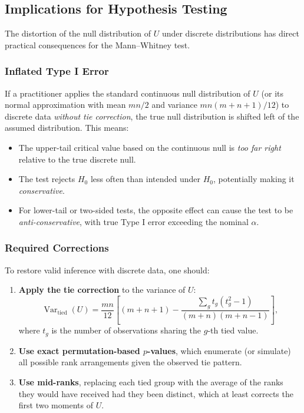 \documentclass[10pt]{article}
\begin{document}
\subsection{Implications for Hypothesis Testing}

The distortion of the null distribution of $U$ under discrete
distributions has direct practical consequences for the
Mann--Whitney test.

\subsubsection{Inflated Type I Error}

If a practitioner applies the standard continuous null distribution
of $U$ (or its normal approximation with mean $mn/2$ and variance
$mn(m+n+1)/12$) to discrete data \emph{without tie correction}, the
true null distribution is shifted left of the assumed distribution.
This means:
\begin{itemize}[noitemsep]
  \item The upper-tail critical value based on the continuous null
        is \emph{too far right} relative to the true discrete null.
  \item The test rejects $H_0$ less often than intended under $H_0$,
        potentially making it \emph{conservative}.
  \item For lower-tail or two-sided tests, the opposite effect can
        cause the test to be \emph{anti-conservative}, with true
        Type I error exceeding the nominal $\alpha$.
\end{itemize}

\subsubsection{Required Corrections}

To restore valid inference with discrete data, one should:
\begin{enumerate}[noitemsep]
  \item \textbf{Apply the tie correction} to the variance of $U$:
        \[
          \operatorname{Var}_{\text{tied}}(U)
          = \frac{mn}{12}\!\left[(m+n+1)
            - \frac{\sum_g t_g(t_g^2-1)}{(m+n)(m+n-1)}\right],
        \]
        where $t_g$ is the number of observations sharing the $g$-th
        tied value.
  \item \textbf{Use exact permutation-based $p$-values}, which
        enumerate (or simulate) all possible rank arrangements given
        the observed tie pattern.
  \item \textbf{Use mid-ranks}, replacing each tied group with the
        average of the ranks they would have received had they been
        distinct, which at least corrects the first two moments of $U$.
\end{enumerate}
\end{document}
